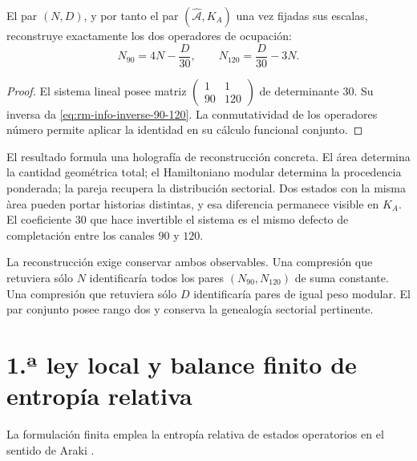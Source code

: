 \begin{theorem}
\label{thm:rm-info-reconstruction-90-120}
El par \((N,D)\), y por tanto el par
\((\widehat{\mathcal A},K_A)\) una vez fijadas sus escalas, reconstruye
exactamente los dos operadores de ocupaci\'on:
\begin{equation}
 \boxed{
 N_{90}=4N-\frac{D}{30},
 \qquad
 N_{120}=\frac{D}{30}-3N.}
 \label{eq:rm-info-inverse-90-120}
\end{equation}
\end{theorem}

\begin{proof}
El sistema lineal posee matriz
\(\left(\begin{smallmatrix}1&1\\90&120\end{smallmatrix}\right)\)
de determinante \(30\). Su inversa da
\cref{eq:rm-info-inverse-90-120}. La conmutatividad de los operadores
n\'umero permite aplicar la identidad en su c\'alculo funcional conjunto.
\end{proof}

El resultado formula una holograf\'ia de reconstrucci\'on concreta. El
\'area determina la cantidad geom\'etrica total; el Hamiltoniano modular
determina la procedencia ponderada; la pareja recupera la distribuci\'on
sectorial. Dos estados con la misma \`area pueden portar historias
distintas, y esa diferencia permanece visible en \(K_A\). El coeficiente
\(30\) que hace invertible el sistema es el mismo defecto de completaci\'on
entre los canales \(90\) y \(120\).

La reconstrucci\'on exige conservar ambos observables. Una compresi\'on que
retuviera s\'olo \(N\) identificar\'ia todos los pares
\((N_{90},N_{120})\) de suma constante. Una compresi\'on que retuviera s\'olo
\(D\) identificar\'ia pares de igual peso modular. El par conjunto posee
rango dos y conserva la genealog\'ia sectorial pertinente.

\section{1.ª ley local y balance finito de entropía relativa}

La formulaci\'on finita emplea la entrop\'ia relativa de estados operatorios
en el sentido de Araki \cite{Araki1976}.

